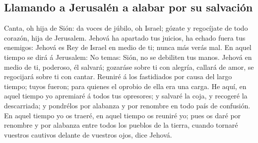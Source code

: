 \hypertarget{llamando-a-jerusaluxe9n-a-alabar-por-su-salvaciuxf3n}{%
\subsection{Llamando a Jerusalén a alabar por su
salvación}\label{llamando-a-jerusaluxe9n-a-alabar-por-su-salvaciuxf3n}}

 Canta, oh hija de Sión: da voces de júbilo, oh Israel;
gózate y regocíjate de todo corazón, hija de Jerusalem. 
Jehová ha apartado tus juicios, ha echado fuera tus enemigos: Jehová es
Rey de Israel en medio de ti; nunca más verás mal.  En
aquel tiempo se dirá á Jerusalem: No temas: Sión, no se debiliten tus
manos.  Jehová en medio de ti, poderoso, él salvará;
gozaráse sobre ti con alegría, callará de amor, se regocijará sobre ti
con cantar.  Reuniré á los fastidiados por causa del
largo tiempo; tuyos fueron; para quienes el oprobio de ella era una
carga.  He aquí, en aquel tiempo yo apremiaré á todos tus
opresores; y salvaré la coja, y recogeré la descarriada; y pondrélos por
alabanza y por renombre en todo país de confusión.  En
aquel tiempo yo os traeré, en aquel tiempo os reuniré yo; pues os daré
por renombre y por alabanza entre todos los pueblos de la tierra, cuando
tornaré vuestros cautivos delante de vuestros ojos, dice Jehová.
